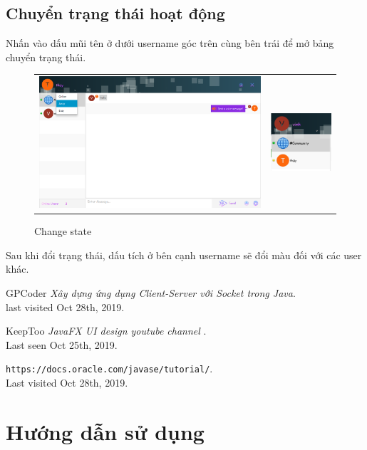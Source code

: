 \documentclass[a4paper]{article}
\begin{document}
	\subsection{Chuyển trạng thái hoạt động}
	Nhấn vào dấu mũi tên ở dưới username góc trên cùng bên trái để mở bảng chuyển trạng thái.
	\begin{figure}[h!]
		\centering
		\begin{tabular}{c c}
		\includegraphics[width=11cm]{state-change.png} &
		\includegraphics[width=3cm]{state-changed.PNG}
		\end{tabular}
		\caption{Change state}
		\label{fig:my_label}
	\end{figure}
	Sau khi đổi trạng thái, dấu tích ở bên cạnh username sẽ đổi màu đối với các user khác.

\newpage
\begin{thebibliography}{9}
GPCoder
\textit{Xây dựng ứng dụng Client-Server với Socket trong Java}. \\
last visited Oct 28th, 2019.
 
KeepToo
\textit{JavaFX UI design youtube channel }.\\
Last seen Oct 25th, 2019.
 
\texttt{https://docs.oracle.com/javase/tutorial/}. \\
Last visited Oct 28th, 2019.
\end{thebibliography}

\newpage
\appendix
\section{Hướng dẫn sử dụng}
\end{document}
